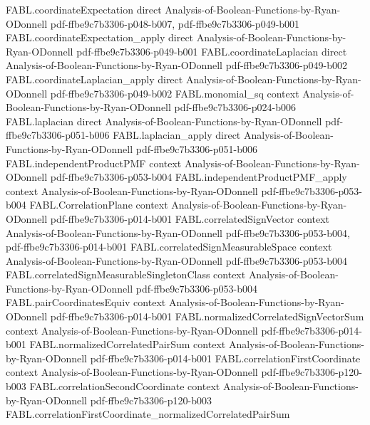 \begin{theorem}
  {FABL.coordinateExpectation}
  {direct}
  {Analysis-of-Boolean-Functions-by-Ryan-ODonnell}
  {pdf-ffbe9c7b3306-p048-b007,
    pdf-ffbe9c7b3306-p049-b001}
\proofstep
  {FABL.coordinateExpectation_apply}
  {direct}
  {Analysis-of-Boolean-Functions-by-Ryan-ODonnell}
  {pdf-ffbe9c7b3306-p049-b001}
\proofstep
  {FABL.coordinateLaplacian}
  {direct}
  {Analysis-of-Boolean-Functions-by-Ryan-ODonnell}
  {pdf-ffbe9c7b3306-p049-b002}
\proofstep
  {FABL.coordinateLaplacian_apply}
  {direct}
  {Analysis-of-Boolean-Functions-by-Ryan-ODonnell}
  {pdf-ffbe9c7b3306-p049-b002}
\proofstep
  {FABL.monomial_sq}
  {context}
  {Analysis-of-Boolean-Functions-by-Ryan-ODonnell}
  {pdf-ffbe9c7b3306-p024-b006}
\proofstep
  {FABL.laplacian}
  {direct}
  {Analysis-of-Boolean-Functions-by-Ryan-ODonnell}
  {pdf-ffbe9c7b3306-p051-b006}
\proofstep
  {FABL.laplacian_apply}
  {direct}
  {Analysis-of-Boolean-Functions-by-Ryan-ODonnell}
  {pdf-ffbe9c7b3306-p051-b006}
\proofstep
  {FABL.independentProductPMF}
  {context}
  {Analysis-of-Boolean-Functions-by-Ryan-ODonnell}
  {pdf-ffbe9c7b3306-p053-b004}
\proofstep
  {FABL.independentProductPMF_apply}
  {context}
  {Analysis-of-Boolean-Functions-by-Ryan-ODonnell}
  {pdf-ffbe9c7b3306-p053-b004}
\proofstep
  {FABL.CorrelationPlane}
  {context}
  {Analysis-of-Boolean-Functions-by-Ryan-ODonnell}
  {pdf-ffbe9c7b3306-p014-b001}
\proofstep
  {FABL.correlatedSignVector}
  {context}
  {Analysis-of-Boolean-Functions-by-Ryan-ODonnell}
  {pdf-ffbe9c7b3306-p053-b004,
    pdf-ffbe9c7b3306-p014-b001}
\proofstep
  {FABL.correlatedSignMeasurableSpace}
  {context}
  {Analysis-of-Boolean-Functions-by-Ryan-ODonnell}
  {pdf-ffbe9c7b3306-p053-b004}
\proofstep
  {FABL.correlatedSignMeasurableSingletonClass}
  {context}
  {Analysis-of-Boolean-Functions-by-Ryan-ODonnell}
  {pdf-ffbe9c7b3306-p053-b004}
\proofstep
  {FABL.pairCoordinatesEquiv}
  {context}
  {Analysis-of-Boolean-Functions-by-Ryan-ODonnell}
  {pdf-ffbe9c7b3306-p014-b001}
\proofstep
  {FABL.normalizedCorrelatedSignVectorSum}
  {context}
  {Analysis-of-Boolean-Functions-by-Ryan-ODonnell}
  {pdf-ffbe9c7b3306-p014-b001}
\proofstep
  {FABL.normalizedCorrelatedPairSum}
  {context}
  {Analysis-of-Boolean-Functions-by-Ryan-ODonnell}
  {pdf-ffbe9c7b3306-p014-b001}
\proofstep
  {FABL.correlationFirstCoordinate}
  {context}
  {Analysis-of-Boolean-Functions-by-Ryan-ODonnell}
  {pdf-ffbe9c7b3306-p120-b003}
\proofstep
  {FABL.correlationSecondCoordinate}
  {context}
  {Analysis-of-Boolean-Functions-by-Ryan-ODonnell}
  {pdf-ffbe9c7b3306-p120-b003}
\proofstep
  {FABL.correlationFirstCoordinate_normalizedCorrelatedPairSum}

\end{theorem}
